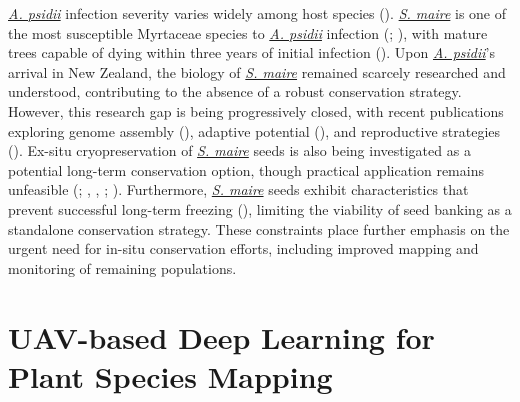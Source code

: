 \documentclass[
]{scrreprt}
\begin{document}
\hyperref[acronyms_AP]{\emph{A. psidii}} infection severity varies
widely among host species
(). \hyperref[acronyms_SM]{\emph{S. maire}} is one of the
most susceptible Myrtaceae species to \hyperref[acronyms_AP]{\emph{A.
psidii}} infection (; ), with mature trees capable of dying within three years of initial
infection (). Upon \hyperref[acronyms_AP]{\emph{A. psidii}}'s arrival in New
Zealand, the biology of \hyperref[acronyms_SM]{\emph{S. maire}} remained
scarcely researched and understood, contributing to the absence of a
robust conservation strategy. However, this research gap is being
progressively closed, with recent publications exploring genome assembly
(),
adaptive potential
(),
and reproductive strategies
(). Ex-situ
cryopreservation of \hyperref[acronyms_SM]{\emph{S. maire}} seeds is
also being investigated as a potential long-term conservation option,
though practical application remains unfeasible
(;
,
,
;
). Furthermore, \hyperref[acronyms_SM]{\emph{S. maire}} seeds
exhibit characteristics that prevent successful long-term freezing
(), limiting the viability of seed banking as a standalone
conservation strategy. These constraints place further emphasis on the
urgent need for in-situ conservation efforts, including improved mapping
and monitoring of remaining populations.

\section{UAV-based Deep Learning for Plant Species
Mapping}\label{uav-based-deep-learning-for-plant-species-mapping}
\end{document}
